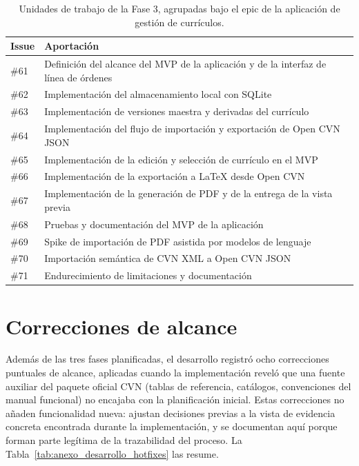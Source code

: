 \begin{table}[htbp]
  \centering
  \footnotesize
  \renewcommand{\arraystretch}{1.45}
  \caption{Unidades de trabajo de la Fase 3, agrupadas bajo el epic de la aplicación de gestión de currículos.}
  \label{tab:anexo_desarrollo_fase3}
  \begin{tabular}{p{} p{}}
    \hline
    \textbf{Issue} & \textbf{Aportación} \\
    \hline
    \#61 & Definición del alcance del MVP de la aplicación y de la interfaz de línea de órdenes \\
    \#62 & Implementación del almacenamiento local con SQLite \\
    \#63 & Implementación de versiones maestra y derivadas del currículo \\
    \#64 & Implementación del flujo de importación y exportación de Open CVN JSON \\
    \#65 & Implementación de la edición y selección de currículo en el MVP \\
    \#66 & Implementación de la exportación a LaTeX desde Open CVN \\
    \#67 & Implementación de la generación de PDF y de la entrega de la vista previa \\
    \#68 & Pruebas y documentación del MVP de la aplicación \\
    \#69 & Spike de importación de PDF asistida por modelos de lenguaje \\
    \#70 & Importación semántica de CVN XML a Open CVN JSON \\
    \#71 & Endurecimiento de limitaciones y documentación \\
    \hline
  \end{tabular}
\end{table}

\section{Correcciones de alcance}
\label{sec:anexo_desarrollo_hotfixes}

Además de las tres fases planificadas, el desarrollo registró ocho
correcciones puntuales de alcance, aplicadas cuando la implementación reveló
que una fuente auxiliar del paquete oficial CVN (tablas de referencia,
catálogos, convenciones del manual funcional) no encajaba con la
planificación inicial. Estas correcciones no añaden funcionalidad nueva:
ajustan decisiones previas a la vista de evidencia concreta encontrada
durante la implementación, y se documentan aquí porque forman parte
legítima de la trazabilidad del proceso. La
Tabla~\ref{tab:anexo_desarrollo_hotfixes} las resume.


